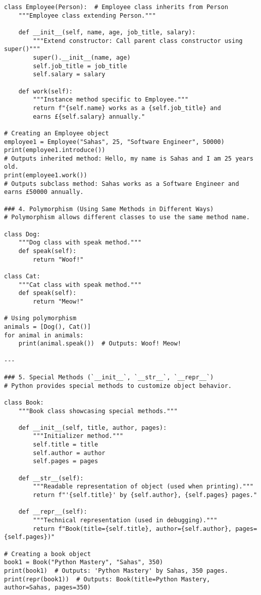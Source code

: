 \begin{verbatim}
class Employee(Person):  # Employee class inherits from Person
    """Employee class extending Person."""

    def __init__(self, name, age, job_title, salary):
        """Extend constructor: Call parent class constructor using super()"""
        super().__init__(name, age)
        self.job_title = job_title
        self.salary = salary

    def work(self):
        """Instance method specific to Employee."""
        return f"{self.name} works as a {self.job_title} and 
        earns £{self.salary} annually."

# Creating an Employee object
employee1 = Employee("Sahas", 25, "Software Engineer", 50000)
print(employee1.introduce())  
# Outputs inherited method: Hello, my name is Sahas and I am 25 years old.
print(employee1.work())  
# Outputs subclass method: Sahas works as a Software Engineer and earns £50000 annually.

### 4. Polymorphism (Using Same Methods in Different Ways)
# Polymorphism allows different classes to use the same method name.

class Dog:
    """Dog class with speak method."""
    def speak(self):
        return "Woof!"

class Cat:
    """Cat class with speak method."""
    def speak(self):
        return "Meow!"

# Using polymorphism
animals = [Dog(), Cat()]
for animal in animals:
    print(animal.speak())  # Outputs: Woof! Meow!

---

### 5. Special Methods (`__init__`, `__str__`, `__repr__`)
# Python provides special methods to customize object behavior.

class Book:
    """Book class showcasing special methods."""

    def __init__(self, title, author, pages):
        """Initializer method."""
        self.title = title
        self.author = author
        self.pages = pages

    def __str__(self):
        """Readable representation of object (used when printing)."""
        return f"'{self.title}' by {self.author}, {self.pages} pages."

    def __repr__(self):
        """Technical representation (used in debugging)."""
        return f"Book(title={self.title}, author={self.author}, pages={self.pages})"

# Creating a book object
book1 = Book("Python Mastery", "Sahas", 350)
print(book1)  # Outputs: 'Python Mastery' by Sahas, 350 pages.
print(repr(book1))  # Outputs: Book(title=Python Mastery, author=Sahas, pages=350)


\end{verbatim}
